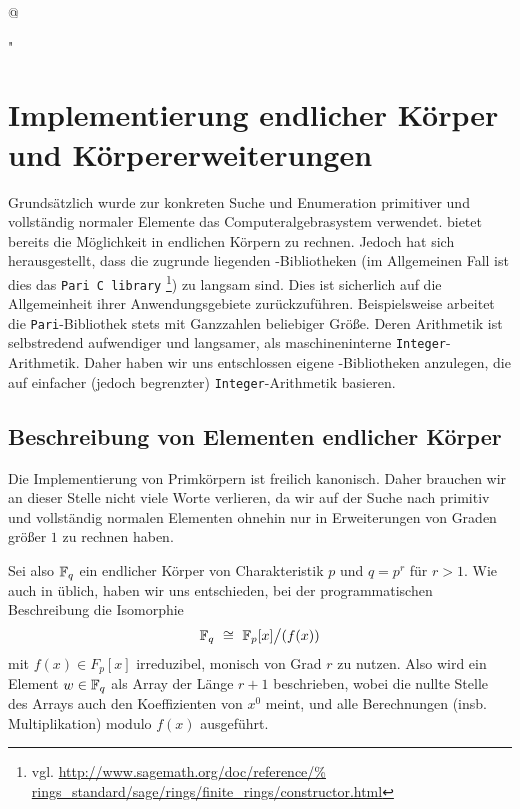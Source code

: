 \lstMakeShortInline[
  basicstyle = \small\normalfont\ttfamily,
  frame = none,
  numberstyle = \tiny,
  breaklines = true,
  escapeinside = {(*}{*)},
  tabsize=3,
  language=C,
  mathescape=true,
  breaklines=true]@

\lstMakeShortInline[
  basicstyle = \small\normalfont\ttfamily,
  frame = none,
  numberstyle = \tiny,
  breaklines = true,
  escapeinside = {(*}{*)},
  tabsize=3,
  language=Python,
  mathescape=true,
  breaklines=true]"

\newcommand{\ttgray}{\color{gray}\ttfamily}


\section{Implementierung endlicher Körper und Körpererweiterungen}
\label{sec:impl_endl_körper}
Grundsätzlich wurde zur konkreten Suche und Enumeration primitiver und
vollständig normaler Elemente das Computeralgebrasystem \sage verwendet.
\sage bietet bereits die Möglichkeit in endlichen Körpern zu rechnen. Jedoch
hat sich herausgestellt, dass die zugrunde liegenden \Clang-Bibliotheken 
(im Allgemeinen Fall ist dies das \texttt{Pari C library}%
\footnote{vgl. \url{http://www.sagemath.org/doc/reference/%
rings_standard/sage/rings/finite_rings/constructor.html}}) 
zu langsam sind. Dies ist sicherlich auf die Allgemeinheit ihrer
Anwendungsgebiete zurückzuführen. Beispielsweise arbeitet die 
\texttt{Pari}-Bibliothek stets mit Ganzzahlen beliebiger Größe. Deren
Arithmetik ist selbstredend aufwendiger und langsamer, als maschineninterne
\texttt{Integer}-Arithmetik. Daher haben wir uns entschlossen eigene 
\Clang-Bibliotheken anzulegen, die auf einfacher (jedoch begrenzter) 
\texttt{Integer}-Arithmetik basieren.

\subsection{Beschreibung von Elementen endlicher Körper}
\label{sub:beschreibung_endliche_koerper}
Die Implementierung von Primkörpern ist freilich kanonisch. Daher brauchen wir
an dieser Stelle nicht viele Worte verlieren, da wir auf der Suche nach
primitiv und vollständig normalen Elementen ohnehin nur in Erweiterungen von
Graden größer $1$ zu rechnen haben.

Sei also $\mathbb{F}_q$ ein endlicher Körper von Charakteristik $p$ und $q = p^r$
für $r>1$.
Wie auch in \sage üblich, haben wir uns entschieden, bei der programmatischen
Beschreibung die Isomorphie
\[ \mathbb{F}_q \ \cong\  \mathbb{F}_p[x] \big/ (f(x))\]
mit $f(x) \in F_p[x]$ irreduzibel, monisch von Grad $r$ zu nutzen. 
Also wird ein Element $w \in \mathbb{F}_q$ als Array der Länge $r+1$ beschrieben,
wobei die nullte Stelle des Arrays auch den Koeffizienten von $x^0$ meint, und
alle Berechnungen (insb. Multiplikation) modulo $f(x)$ ausgeführt.

